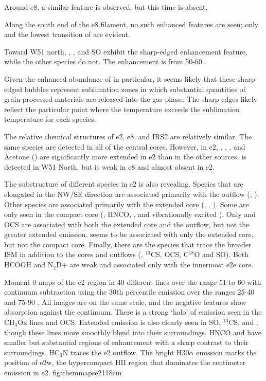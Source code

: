 \documentclass{aa}
\begin{document}
Around e8, a similar feature is observed, but this time \dimethylether is absent.

Along the south end of the e8 filament, no such enhanced features are seen; only
\formaldehyde and the lowest transition of \methanol are evident.

Toward W51 north, \methanol, \formaldehyde, and SO exhibit the sharp-edged enhancement feature,
while the other species do not.  The enhancement is from 50-60 \kms.

Given the enhanced abundance of \methanol in particular, it seems likely that these
sharp-edged bubbles represent sublimation zones in which substantial quantities
of grain-processed materials are released into the gas phase.  The sharp edges
likely reflect the particular point where the temperature exceeds the sublimation
temperature for each species.

The relative chemical structures of e2, e8, and IRS2 are relatively similar.
The same species are detected in all of the central cores.  However, in e2,
\dimethylether, \methylformate, \ethylcyanide, and Acetone (\acetone) are
significantly more extended in e2 than in the other sources.
\gaucheethanol is detected in W51 North, but is weak in e8 and almost absent
in e2.

The substructure of different species in e2 is also revealing.  Species that
are elongated in the NW/SE direction are associated primarily with the outflow
(\cyanoacetylene, \ethylcyanide).  Other species are associated primarily with
the extended core (\methylformate, \dimethylether, \acetone).  Some are only
seen in the compact core (\methyleneamidogen, HNCO, \formamide, and
vibrationally excited \cyanoacetylene).  Only \methanol and OCS are associated
with both the extended core and the outflow, but not the greater extended
emission.  \ketene seems to be associated with only the extended core, but not
the compact core. Finally, there are the species that trace the broader ISM in
addition to the cores and outflows (\formaldehyde, $^{13}$CS, OCS, C$^{18}$O
and SO).  Both HCOOH and N$_2$D+ are weak and associated only with the innermost
e2e core.

{Moment 0 maps of the e2 region in 40 different lines over the range 51 to 60
\kms with continuum subtraction using the 30th percentile emission
over the ranges 25-40 and 75-90 \kms.  All images are on the same scale, and
the negative features show absorption against the continuum.  There
is a strong `halo' of emission seen in the CH$_3$Ox lines and OCS.  Extended
emission is also clearly seen in SO, $^{13}$CS, and \formaldehyde, though these
lines more smoothly blend into their surroundings.  HNCO and \formamide have
smaller but substantial regions of enhancement with a sharp contrast to their
surroundings.  HC$_3$N traces the e2 outflow.  The bright H30$\alpha$ emission
marks the position of e2w, the hypercompact HII region that dominates the
centimeter emission in e2.
}{fig:chemmapse2}{1}{18cm}
\end{document}
